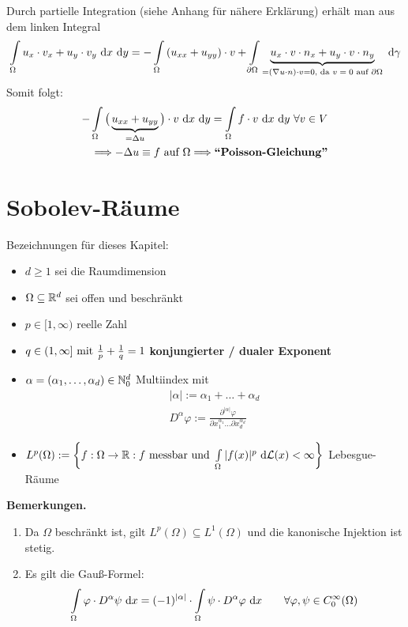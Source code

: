 Durch partielle Integration (siehe Anhang für nähere Erklärung) erhält man aus dem linken Integral
\begin{align*}
\int\limits_\Omega u_x\cdot v_x+u_y\cdot v_y\d x\d y
=-\int\limits_\Omega\left(u_{xx}+u_{yy}\right)\cdot v
+\int\limits_{\partial\Omega}\underbrace{u_x\cdot v\cdot n_x+u_y\cdot v\cdot n_y}_{=(\nabla u\cdot n)\cdot v=0\text{, da $v=0$ auf }\partial\Omega}\d\gamma
\end{align*}
Somit folgt:
\begin{align*}
-\int\limits_\Omega\big(\underbrace{u_{xx}+u_{yy}}_{=\Delta u}\big)\cdot v\d x\d y=\int\limits_\Omega f\cdot v\d x\d y~\forall v\in V\\
\Longrightarrow-\Delta u\equiv f\text{ auf }\Omega\Longrightarrow\textbf{``Poisson-Gleichung''}
\end{align*}

\section{Sobolev-Räume}
Bezeichnungen für dieses Kapitel:

\begin{itemize}
\item $d\geq1$ sei die Raumdimension
\item $\Omega\subseteq\R^d$ sei offen und beschränkt
\item $p\in[1,\infty)$ reelle Zahl
\item $q\in(1,\infty]\mit\frac{1}{p}+\frac{1}{q}=1$ \textbf{konjungierter / dualer Exponent}
\item $\alpha=(\alpha_1,\ldots,\alpha_d)\in\N_0^d$ Multiindex mit
\begin{align*}
|\alpha|:=\alpha_1+\ldots+\alpha_d\\
D^\alpha\varphi:=\frac{\partial^{|\alpha|}\varphi}{\partial x_1^{\alpha_1}\hdots\partial x_d^{\alpha_d}}
\end{align*}
\item $L^p(\Omega):=\left\lbrace f:\Omega\to\R:f\text{ messbar und }\int\limits_\Omega |f(x)|^p\d\mathcal{L}(x)<\infty\right\rbrace$ Lebesgue-Räume
\end{itemize}

\textbf{Bemerkungen.}
\begin{enumerate}
\item Da $\Omega$ beschränkt ist, gilt $L^p(\Omega)\subseteq L^1(\Omega)$ und die kanonische Injektion ist stetig.
\item Es gilt die Gauß-Formel:
\begin{align}\label{GaussFormel}
\int\limits_\Omega\varphi\cdot D^\alpha\psi\d x=(-1)^{|\alpha|}\cdot\int\limits_\Omega\psi\cdot D^\alpha\varphi\d x\qquad\forall \varphi,\psi\in C_0^\infty(\Omega)
\end{align}
\end{enumerate}


